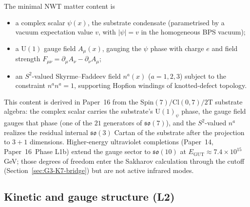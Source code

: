 \documentclass[11pt]{article}
\newcommand{\so}{\mathfrak{so}}
\newcommand{\U}{\mathrm{U}}
\begin{document}
The minimal NWT matter content is
\begin{itemize}
\item a complex scalar $\psi(x)$, the substrate condensate
      (parametrised by a vacuum expectation value $v$, with
      $|\psi|=v$ in the homogeneous BPS vacuum);
\item a $\U(1)$ gauge field $A_\mu(x)$, gauging the $\psi$ phase
      with charge $e$ and field strength
      $F_{\mu\nu} = \partial_\mu A_\nu - \partial_\nu A_\mu$;
\item an $S^2$-valued Skyrme--Faddeev field $n^a(x)$ ($a=1,2,3$)
      subject to the constraint $n^a n^a = 1$, supporting Hopfion
      windings of knotted-defect topology.
\end{itemize}
This content is derived in Paper~16 from the
$\mathrm{Spin}(7)/\mathrm{Cl}(0,7)/2\mathrm{T}$ substrate algebra:
the complex scalar carries the substrate's $\U(1)_\psi$ phase, the
gauge field gauges that phase (one of the $21$ generators of
$\so(7)$), and the $S^2$-valued $n^a$ realizes the residual
internal $\so(3)$ Cartan of the substrate after the projection to
$3{+}1$ dimensions.  Higher-energy ultraviolet completions
(Paper~14, Paper~16~Phase L1b) extend the gauge sector to
$\so(10)$ at $E_{\mathrm{GUT}} \approx 7.4 \times 10^{15}$\,GeV;
those degrees of freedom enter the Sakharov calculation through
the cutoff (Section~\ref{sec:G3-K7-bridge}) but are not active
infrared modes.

\subsection{Kinetic and gauge structure (L2)}
\end{document}
